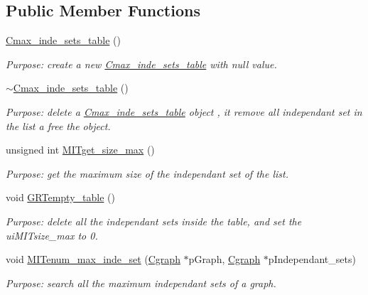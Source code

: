 \subsection*{Public Member Functions}
\begin{DoxyCompactItemize}
\item 
\hyperlink{class_cmax__inde__sets__table_a39fc5527f19ec28901ebc62407895dc9}{Cmax\+\_\+inde\+\_\+sets\+\_\+table} ()
\begin{DoxyCompactList}\small\item\em Purpose\+: create a new \hyperlink{class_cmax__inde__sets__table}{Cmax\+\_\+inde\+\_\+sets\+\_\+table} with null value. \end{DoxyCompactList}\item 
\hyperlink{class_cmax__inde__sets__table_ab80f89eb0991ad10c416082717822d9d}{$\sim$\+Cmax\+\_\+inde\+\_\+sets\+\_\+table} ()
\begin{DoxyCompactList}\small\item\em Purpose\+: delete a \hyperlink{class_cmax__inde__sets__table}{Cmax\+\_\+inde\+\_\+sets\+\_\+table} object , it remove all independant set in the list a free the object. \end{DoxyCompactList}\item 
unsigned int \hyperlink{class_cmax__inde__sets__table_a36ec7fecff6ba7547a936dbb964b9572}{M\+I\+Tget\+\_\+size\+\_\+max} ()
\begin{DoxyCompactList}\small\item\em Purpose\+: get the maximum size of the independant set of the list. \end{DoxyCompactList}\item 
void \hyperlink{class_cmax__inde__sets__table_ae5b5c5509b580597701d26d8a5a45faa}{G\+R\+Tempty\+\_\+table} ()
\begin{DoxyCompactList}\small\item\em Purpose\+: delete all the independant sets inside the table, and set the ui\+M\+I\+Tsize\+\_\+max to 0. \end{DoxyCompactList}\item 
void \hyperlink{class_cmax__inde__sets__table_a15a4bbf3ad99d6411cc79a2b3ab924c6}{M\+I\+Tenum\+\_\+max\+\_\+inde\+\_\+set} (\hyperlink{class_cgraph}{Cgraph} $\ast$p\+Graph, \hyperlink{class_cgraph}{Cgraph} $\ast$p\+Independant\+\_\+sets)
\begin{DoxyCompactList}\small\item\em Purpose\+: search all the maximum independant sets of a graph. \end{DoxyCompactList}\item 

\end{DoxyCompactItemize}
